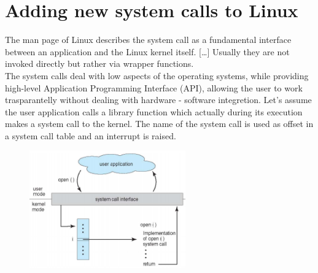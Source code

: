 \documentclass{article}
\begin{document}
\section{Adding new system calls to Linux}
The man page of Linux describes the system call as a fundamental interface between an application and
the Linux kernel itself. [\dots] Usually they are not invoked directly but rather via wrapper functions.\\

The system calls deal with low aspects of the operating systems, while providing high-level Application
Programming Interface (API), allowing the user to work trasparantelly without dealing with hardware - software integretion. 
Let's assume the user application calls a library function which actually during its execution makes a
system call to the kernel. The name of the system call is used as offset in a system call table and 
an interrupt is raised.\\ 

\begin{figure}[h!]
\centering
  \includegraphics[width=0.6\textwidth]{./syscall.png}
\end{figure}
\end{document}
